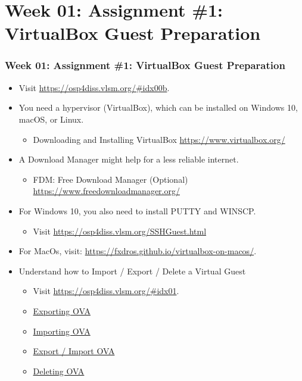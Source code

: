 \documentclass[xcolor=table, notheorems, hyperref={pdfpagelabels=false}]{beamer}
\begin{document}
\section{Week 01: Assignment \#1: VirtualBox Guest Preparation}
\begin{frame}[fragile]
\frametitle{Week 01: Assignment \#1: VirtualBox Guest Preparation}
\begin{itemize}
\item Visit \url{https://osp4diss.vlsm.org/\#idx00b}.
\item You need a hypervisor (VirtualBox), which can be installed on Windows 10, macOS, or Linux.
\begin{itemize}
\item Downloading and Installing VirtualBox
\url{https://www.virtualbox.org/}
\end{itemize}
\item A Download Manager might help for a less reliable internet.
\begin{itemize}
\item FDM: Free Download Manager (Optional)\\
\url{https://www.freedownloadmanager.org/}
\end{itemize}
\item For Windows 10, you also need to install PUTTY and WINSCP.
\begin{itemize}
\item Visit \url{https://osp4diss.vlsm.org/SSHGuest.html}
\end{itemize}
\item For MacOs, visit: {\scriptsize \url{https://fxdros.github.io/virtualbox-on-macos/}}.
\item Understand how to Import / Export / Delete a Virtual Guest
\begin{itemize}
\item Visit \url{https://osp4diss.vlsm.org/\#idx01}.
\item \href{https://osp4diss.vlsm.org/DebianGuestExportOva.html}{Exporting OVA}
\item \href{https://osp4diss.vlsm.org/DebianGuestImportOva.html}{Importing OVA}
\item \href{https://osp4diss.vlsm.org/ExportImportGuests.html}{Export / Import OVA}
\item \href{https://osp4diss.vlsm.org/DebianGuestDeleteOva.html}{Deleting OVA}
\end{itemize}
\end{itemize}
\end{frame}
\end{document}
